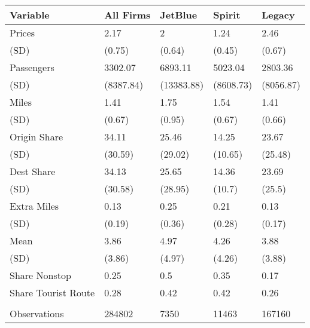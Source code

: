 
\begin{tabular}[t]{lllll}
\toprule
Variable & All Firms & JetBlue & Spirit & Legacy\\
\midrule
Prices & 2.17 & 2 & 1.24 & 2.46\\
(SD) & (0.75) & (0.64) & (0.45) & (0.67)\\
Passengers & 3302.07 & 6893.11 & 5023.04 & 2803.36\\
(SD) & (8387.84) & (13383.88) & (8608.73) & (8056.87)\\
Miles & 1.41 & 1.75 & 1.54 & 1.41\\
(SD) & (0.67) & (0.95) & (0.67) & (0.66)\\
Origin Share & 34.11 & 25.46 & 14.25 & 23.67\\
(SD) & (30.59) & (29.02) & (10.65) & (25.48)\\
Dest Share & 34.13 & 25.65 & 14.36 & 23.69\\
(SD) & (30.58) & (28.95) & (10.7) & (25.5)\\
Extra Miles & 0.13 & 0.25 & 0.21 & 0.13\\
(SD) & (0.19) & (0.36) & (0.28) & (0.17)\\
Mean & 3.86 & 4.97 & 4.26 & 3.88\\
(SD) & (3.86) & (4.97) & (4.26) & (3.88)\\
Share Nonstop & 0.25 & 0.5 & 0.35 & 0.17\\
Share Tourist Route & 0.28 & 0.42 & 0.42 & 0.26\\
\midrule\\
Observations & 284802 & 7350 & 11463 & 167160\\
\bottomrule
\end{tabular}
